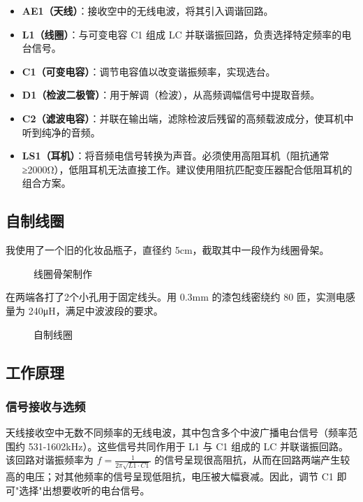 \documentclass[12pt,UTF8]{ctexbook}
\begin{document}
\begin{itemize}[leftmargin=2cm]
	\item \textbf{AE1（天线）}：接收空中的无线电波，将其引入调谐回路。
	\item \textbf{L1（线圈）}：与可变电容 C1 组成 LC 并联谐振回路，负责选择特定频率的电台信号。
	\item \textbf{C1（可变电容）}：调节电容值以改变谐振频率，实现选台。
	\item \textbf{D1（检波二极管）}：用于解调（检波），从高频调幅信号中提取音频。
	\item \textbf{C2（滤波电容）}：并联在输出端，滤除检波后残留的高频载波成分，使耳机中听到纯净的音频。
	\item \textbf{LS1（耳机）}：将音频电信号转换为声音。必须使用高阻耳机（阻抗通常≥2000Ω），低阻耳机无法直接工作。建议使用阻抗匹配变压器配合低阻耳机的组合方案。
\end{itemize}

\subsection{自制线圈}

我使用了一个旧的化妆品瓶子，直径约 5cm，截取其中一段作为线圈骨架。

\begin{figure}[H]
	\centering
	\caption{线圈骨架制作}
	\label{fig:coil-former}
\end{figure}

在两端各打了2个小孔用于固定线头。用 0.3mm 的漆包线密绕约 80 匝，实测电感量为 240μH，满足中波波段的要求。

\begin{figure}[H]
	\centering
	\caption{自制线圈}
	\label{fig:homemade-coil}
\end{figure}

\subsection{工作原理}

\subsubsection{信号接收与选频}

天线接收空中无数不同频率的无线电波，其中包含多个中波广播电台信号（频率范围约 531-1602kHz）。这些信号共同作用于 L1 与 C1 组成的 LC 并联谐振回路。该回路对谐振频率为 $f = \frac{1}{2\pi\sqrt{L1 \cdot C1}}$ 的信号呈现很高阻抗，从而在回路两端产生较高的电压；对其他频率的信号呈现低阻抗，电压被大幅衰减。因此，调节 C1 即可"选择"出想要收听的电台信号。
\end{document}
